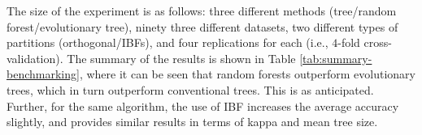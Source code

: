\documentclass[]{elsarticle} %
\begin{document}
\begin{table}

\caption{\label{tab:summary}\label{tab:summary-benchmarking}Summary of Benchmarking Experiment}
\centering
{}
\end{table}

The size of the experiment is as follows: three different methods
(tree/random forest/evolutionary tree), ninety three different datasets,
two different types of partitions (orthogonal/IBFs), and four
replications for each (i.e., \(4\)-fold cross-validation). The summary
of the results is shown in Table \ref{tab:summary-benchmarking}, where
it can be seen that random forests outperform evolutionary trees, which
in turn outperform conventional trees. This is as anticipated. Further,
for the same algorithm, the use of IBF increases the average accuracy
slightly, and provides similar results in terms of kappa and mean tree
size.
\end{document}
